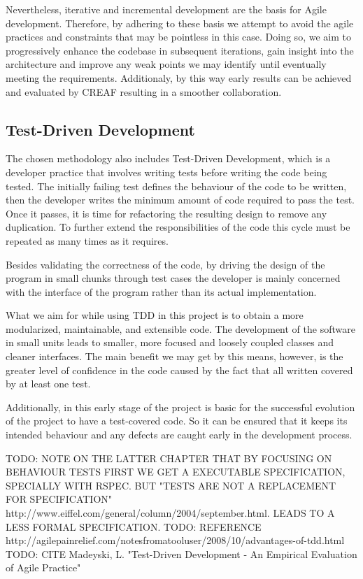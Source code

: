 Nevertheless, iterative and incremental development are the basis for Agile development. Therefore, by adhering to these basis we attempt to avoid the agile practices and constraints that may be pointless in this case. Doing so, we aim to progressively enhance the codebase in subsequent iterations, gain insight into the architecture and improve any weak points we may identify until eventually meeting the requirements. Additionaly, by this way early results can be achieved and evaluated by CREAF resulting in a smoother collaboration.

\subsection{Test-Driven Development}

The chosen methodology also includes Test-Driven Development, which is a developer practice that involves writing tests before writing the code being tested. The initially failing test defines the behaviour of the code to be written, then the developer writes the minimum amount of code required to pass the test. Once it passes, it is time for refactoring the resulting design to remove any duplication. To further extend the responsibilities of the code this cycle must be repeated as many times as it requires.

Besides validating the correctness of the code, by driving the design of the program in small chunks through test cases the developer is mainly concerned with the interface of the program rather than its actual implementation.

What we aim for while using TDD in this project is to obtain a more modularized, maintainable, and extensible code. The development of the software in small units leads to smaller, more focused and loosely coupled classes and cleaner interfaces. The main benefit we may get by this means, however, is the greater level of confidence in the code caused by the fact that all written covered by at least one test.

Additionally, in this early stage of the project is basic for the successful evolution of the project to have a test-covered code. So it can be ensured that it keeps its intended behaviour and any defects are caught early in the development process.

TODO: NOTE ON THE LATTER CHAPTER THAT BY FOCUSING ON BEHAVIOUR TESTS FIRST WE GET A EXECUTABLE SPECIFICATION, SPECIALLY WITH RSPEC. BUT "TESTS ARE NOT A REPLACEMENT FOR SPECIFICATION" http://www.eiffel.com/general/column/2004/september.html. LEADS TO A LESS FORMAL SPECIFICATION.
TODO: REFERENCE http://agilepainrelief.com/notesfromatooluser/2008/10/advantages-of-tdd.html
TODO: CITE Madeyski, L. "Test-Driven Development - An Empirical Evaluation of Agile Practice"